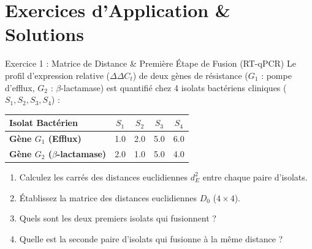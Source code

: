 \documentclass[11pt,a4paper]{article}
\begin{document}
\section{Exercices d'Application \& Solutions}

\begin{exercicebox}{Exercice 1 : Matrice de Distance \& Première Étape de Fusion (RT-qPCR)}
Le profil d'expression relative ($\Delta\Delta C_t$) de deux gènes de résistance ($G_1$ : pompe d'efflux, $G_2$ : $\beta$-lactamase) est quantifié chez 4 isolats bactériens cliniques ($S_1, S_2, S_3, S_4$) :
\begin{center}
\small
\begin{tabular}{lcccc}
\toprule
\textbf{Isolat Bactérien} & $S_1$ & $S_2$ & $S_3$ & $S_4$ \\
\midrule
\textbf{Gène $G_1$ (Efflux)} & 1.0 & 2.0 & 5.0 & 6.0 \\
\textbf{Gène $G_2$ ($\beta$-lactamase)} & 2.0 & 1.0 & 5.0 & 4.0 \\
\bottomrule
\end{tabular}
\end{center}
\begin{enumerate}[label=\textbf{\alph*.}]
  \item Calculez les carrés des distances euclidiennes $d_E^2$ entre chaque paire d'isolats.
  \item Établissez la matrice des distances euclidiennes $D_0$ ($4 \times 4$).
  \item Quels sont les deux premiers isolats qui fusionnent ?
  \item Quelle est la seconde paire d'isolats qui fusionne à la même distance ?
\end{enumerate}
\end{exercicebox}
\end{document}
